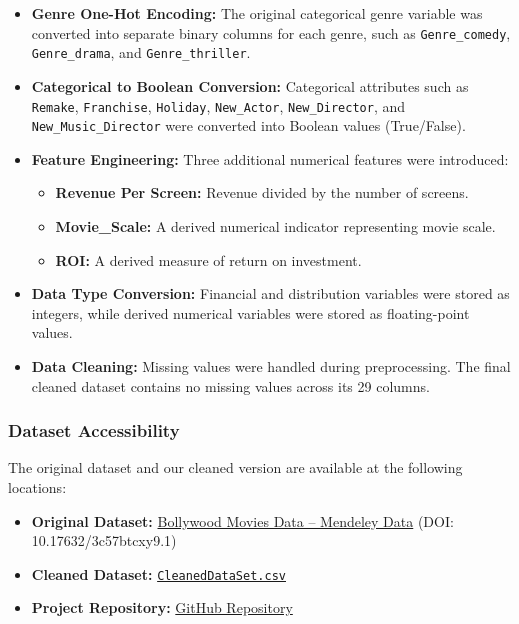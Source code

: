 \documentclass[a4paper, 11pt]{article}
\begin{document}
\begin{itemize}
    \item \textbf{Genre One-Hot Encoding:}
    The original categorical genre variable was converted into separate binary columns for each genre, such as \texttt{Genre\_comedy}, \texttt{Genre\_drama}, and \texttt{Genre\_thriller}.

    \item \textbf{Categorical to Boolean Conversion:}
    Categorical attributes such as \texttt{Remake}, \texttt{Franchise}, \texttt{Holiday}, \texttt{New\_Actor}, \texttt{New\_Director}, and \texttt{New\_Music\_Director} were converted into Boolean values (True/False).

    \item \textbf{Feature Engineering:}
    Three additional numerical features were introduced:
    \begin{itemize}
        \item \textbf{Revenue Per Screen:} Revenue divided by the number of screens.
        \item \textbf{Movie\_Scale:} A derived numerical indicator representing movie scale.
        \item \textbf{ROI:} A derived measure of return on investment.
    \end{itemize}

    \item \textbf{Data Type Conversion:}
    Financial and distribution variables were stored as integers, while derived numerical variables were stored as floating-point values.

    \item \textbf{Data Cleaning:}
    Missing values were handled during preprocessing. The final cleaned dataset contains no missing values across its 29 columns.
\end{itemize}

\subsubsection*{Dataset Accessibility}

The original dataset and our cleaned version are available at the following locations:

\begin{itemize}
    \item \textbf{Original Dataset:} \href{https://data.mendeley.com/datasets/3c57btcxy9/1}{Bollywood Movies Data -- Mendeley Data} (DOI: 10.17632/3c57btcxy9.1)
    \item \textbf{Cleaned Dataset:} \href{https://drive.google.com/file/d/17AiPMw-PDkxZx-mt27n7F4h9nfl6hwbv/view?usp=sharing}{\texttt{CleanedDataSet.csv}}
    \item \textbf{Project Repository:} \href{https://github.com/Chaos0Speed/IndianMovies}{GitHub Repository}
\end{itemize}
\end{document}
